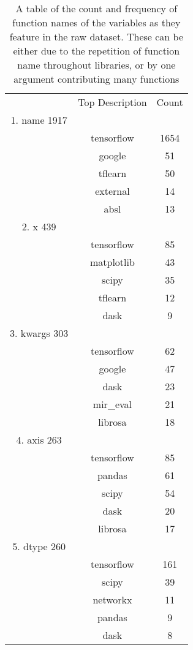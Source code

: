 \begin{table}[h]
    \begin{center}
    \begin{tabular}{c | c | c  }       
 & Top Description & Count\\

1. name   1917     \\
\hline
 & tensorflow    & 1654       \\
 & google        & 51         \\
 & tflearn       & 50         \\
 & external      & 14         \\
 & absl          & 13         \\

2. x       439     \\
\hline
  & tensorflow    & 85         \\
 & matplotlib    & 43         \\
 & scipy         & 35         \\
 & tflearn       & 12         \\
 & dask          & 9          \\

3. kwargs  303     \\
\hline
 & tensorflow    & 62         \\
 & google        & 47         \\
 & dask          & 23         \\
 & mir\_eval      & 21         \\
 & librosa       & 18         \\

4. axis    263     \\
\hline
 & tensorflow    & 85         \\
 & pandas        & 61         \\
 & scipy         & 54         \\
 & dask          & 20         \\
 & librosa       & 17         \\

5. dtype   260     \\
\hline
 & tensorflow    & 161        \\
 & scipy         & 39         \\
 & networkx      & 11         \\
 & pandas        & 9          \\
 & dask          & 8          \\




    \end{tabular}
        \caption { A table of the count and frequency of function names of the variables as they feature in the raw dataset. 
        These can be either due to the repetition of function name throughout libraries, or by one argument contributing many functions }
    \label{table:function_histogram} 
    \end{center}
\end{table}